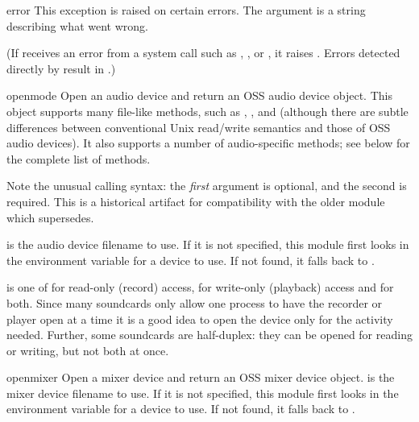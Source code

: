 \begin{excdesc}{error}
This exception is raised on certain errors.  The argument is a string
describing what went wrong.

(If  receives an error from a system call such as
, , or , it
raises .  Errors detected directly by
 result in .)
\end{excdesc}

\begin{funcdesc}{open}{mode}
Open an audio device and return an OSS audio device object.  This
object supports many file-like methods, such as ,
, and  (although there are subtle
differences between conventional Unix read/write semantics and those of
OSS audio devices).  It also supports a number of audio-specific
methods; see below for the complete list of methods.

Note the unusual calling syntax: the \emph{first} argument is optional,
and the second is required.  This is a historical artifact for
compatibility with the older  module which
 supersedes.  %

 is the audio device filename to use.  If it is not
specified, this module first looks in the environment variable
 for a device to use.  If not found, it falls back to
.

 is one of  for read-only (record) access,
 for write-only (playback) access and  for both.
Since many soundcards only allow one process to have the recorder or
player open at a time it is a good idea to open the device only for the
activity needed.  Further, some soundcards are half-duplex: they can be
opened for reading or writing, but not both at once.
\end{funcdesc}

\begin{funcdesc}{openmixer}{}
Open a mixer device and return an OSS mixer device object.  
 is the mixer device filename to use.  If it is
not specified, this module first looks in the environment variable
 for a device to use.  If not found, it falls back to
.

\end{funcdesc}

